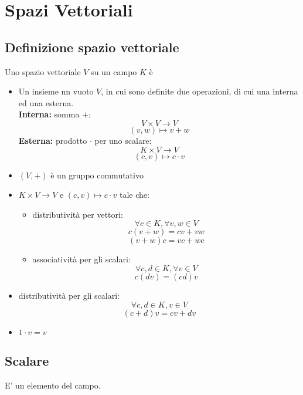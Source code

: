 \section{Spazi Vettoriali}

\subsection{Definizione spazio vettoriale}
Uno spazio vettoriale \(V\) su un campo \(K\) è

\begin{itemize}

	\item Un insieme nn vuoto \(V\), in cui sono definite due operazioni, di cui una interna ed una esterna.
	\\\textbf{Interna:} somma \(+\):
	\[V\times V\rightarrow V\]
	\[(v,w)\mapsto v+w\]
	\textbf{Esterna:} prodotto \(\cdot\) per uno scalare:
	\[K\times V\rightarrow V\]
	\[(c, v)\mapsto c\cdot v\]

	\item \((V,+)\) è un gruppo commutativo

	\item \(K\times V\rightarrow V\) e \((c, v)\mapsto c\cdot v\) tale che:

	\begin{itemize}

		\item distributività per vettori:
		\[\forall c\in K,\forall v,w\in V\]
		\[c(v+w)=cv+vw\]
		\[(v+w)c=vc+wc\]

		\item associatività per gli scalari:
		\[\forall c,d\in K, \forall v\in V\]
		\[c(dv)=(cd)v\]
		
	\end{itemize}

	\item distributività per gli scalari:
	\[\forall c,d\in K, v\in V\]
	\[(c+d)v=cv+dv\]

	\item \(1\cdot v=v\)


\end{itemize}

\subsection{Scalare}
E' un elemento del campo.

